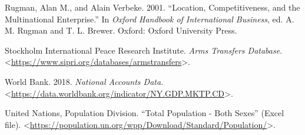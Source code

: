 \documentclass[11pt,]{article}
\begin{document}
Rugman, Alan M., and Alain Verbeke. 2001. ``Location, Competitiveness,
and the Multinational Enterprise.'' In \emph{Oxford Handbook of
International Business}, ed. A. M. Rugman and T. L. Brewer. Oxford:
Oxford University Press.

Stockholm International Peace Research Institute. \emph{Arms Transfers
Database}.
\textless{}\url{https://www.sipri.org/databases/armstransfers}\textgreater{}.

World Bank. 2018. \emph{National Accounts Data}.
\textless{}\url{https://data.worldbank.org/indicator/NY.GDP.MKTP.CD}\textgreater{}.

United Nations, Population Division. ``Total Population - Both Sexes''
(Excel file).
\textless{}\url{https://population.un.org/wpp/Download/Standard/Population/}\textgreater{}.
\end{document}
